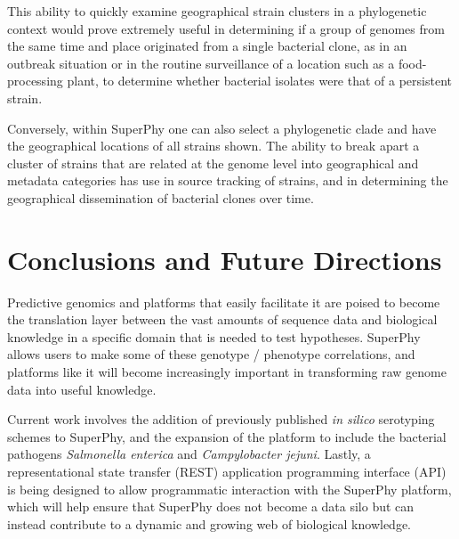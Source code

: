 \documentclass[doublespacing, linenumbers]{bmcart}
\begin{document}
This ability to quickly examine geographical strain clusters in a phylogenetic context would prove extremely useful in determining if a group of genomes from the same time and place originated from a single bacterial clone, as in an outbreak situation or in the routine surveillance of a location such as a food-processing plant, to determine whether bacterial isolates were that of a persistent strain. 

Conversely, within SuperPhy one can also select a phylogenetic clade and have the geographical locations of all strains shown. The ability to break apart a cluster of strains that are related at the genome level into geographical and metadata categories has use in source tracking of strains, and in determining the geographical dissemination of bacterial clones over time.

\section{Conclusions and Future Directions}
Predictive genomics and platforms that easily facilitate it are poised to become the translation layer between the vast amounts of sequence data and biological knowledge in a specific domain that is needed to test hypotheses. SuperPhy allows users to make some of these genotype / phenotype correlations, and platforms like it will become increasingly important in transforming raw genome data into useful knowledge. 

Current work involves the addition of previously published \textit{in silico} serotyping schemes to SuperPhy, and the expansion of the platform to include the bacterial pathogens \textit{Salmonella enterica} and \textit{Campylobacter jejuni}. Lastly, a representational state transfer (REST) application programming interface (API) is being designed to allow programmatic interaction with the SuperPhy platform, which will help ensure that SuperPhy does not become a data silo but can instead contribute to a dynamic and growing web of biological knowledge.
 


\end{document}
